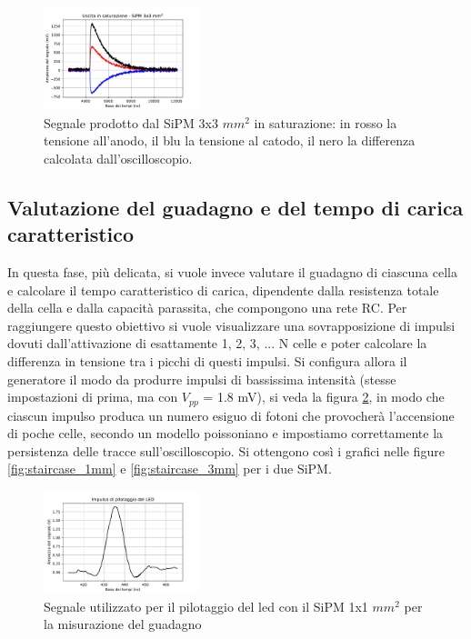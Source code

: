 \documentclass[journal]{IEEEtran}
\begin{document}
\begin{figure}[H]%
\begin{center}
\includegraphics[width=0.40\textwidth]{analysis/output/SiPM_sat_3mm.pdf}
\caption{Segnale prodotto dal SiPM 3x3 $mm^2$ in saturazione: in rosso la tensione all'anodo, il blu la tensione al catodo, il nero la differenza calcolata dall'oscilloscopio.}
\label{fig:SiPM_sat_3mm}
\end{center}
\end{figure}

\subsection{Valutazione del guadagno e del tempo di carica caratteristico}
In questa fase, più delicata, si vuole invece valutare il guadagno di ciascuna cella e calcolare il tempo caratteristico di carica, dipendente dalla resistenza totale della cella e dalla capacità parassita, che compongono una rete RC. Per raggiungere questo obiettivo si vuole visualizzare una sovrapposizione di impulsi dovuti dall'attivazione di esattamente 1, 2, 3, ... N celle e poter calcolare la differenza in tensione tra i picchi di questi impulsi. Si configura allora il generatore il modo da produrre impulsi di bassissima intensità (stesse impostazioni di prima, ma con $V_{pp}$ = 1.8 mV), si veda la figura \ref{fig:ledp}, in modo che ciascun impulso produca un numero esiguo di fotoni che provocherà l'accensione di poche celle, secondo un modello poissoniano e impostiamo correttamente la persistenza delle tracce sull'oscilloscopio. Si ottengono così i grafici nelle figure \ref{fig:staircase_1mm} e \ref{fig:staircase_3mm} per i due SiPM. 

\begin{figure}[H]%
\begin{center}
\includegraphics[width=0.40\textwidth]{analysis/output/SiPM_ledp.pdf}
\caption{Segnale utilizzato per il pilotaggio del led con il SiPM 1x1 $mm^2$ per la misurazione del guadagno}
\label{fig:ledp}
\end{center}
\end{figure}
\end{document}

